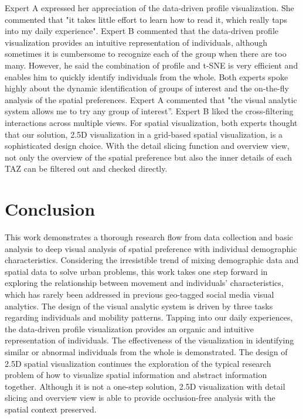 \documentclass{ieeeaccess}
\begin{document}
Expert A expressed her appreciation of the data-driven profile visualization. She commented that "it takes little effort to learn how to read it, which really taps into my daily experience". Expert B commented that the data-driven profile visualization provides an intuitive representation of individuals, although sometimes it is cumbersome to recognize each of the group when there are too many. However, he said the combination of profile and t-SNE is very efficient and enables him to quickly identify individuals from the whole. Both experts spoke highly about the dynamic identification of groups of interest and the on-the-fly analysis of the spatial preferences. Expert A commented that "the visual analytic system allows me to try any group of interest''. Expert B liked the cross-filtering interactions across multiple views. For spatial visualization, both experts thought that our solution, 2.5D visualization in a grid-based spatial visualization, is a sophisticated design choice. With the detail slicing function and overview view, not only the overview of the spatial preference but also the inner details of each TAZ can be filtered out and checked directly.

\section{Conclusion}
\label{sec:conclusion}
This work demonstrates a thorough research flow from data collection and basic analysis to deep visual analysis of spatial preference with individual demographic characteristics. Considering the irresistible trend of mixing demographic data and spatial data to solve urban problems, this work takes one step forward in exploring the relationship between movement and individuals’ characteristics, which has rarely been addressed in previous geo-tagged social media visual analytics. The design of the visual analytic system is driven by three tasks regarding individuals and mobility patterns. Tapping into our daily experiences, the data-driven profile visualization provides an organic and intuitive representation of individuals. The effectiveness of the visualization in identifying similar or abnormal individuals from the whole is demonstrated. The design of 2.5D spatial visualization continues the exploration of the typical research problem of how to visualize spatial information and abstract information together. Although it is not a one-step solution, 2.5D visualization with detail slicing and overview view is able to provide occlusion-free analysis with the spatial context preserved.
\end{document}

